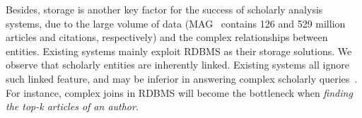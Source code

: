 %




Besides, storage is another key factor for the success of scholarly analysis systems, due to the large volume of data (\eg MAG~\cite{sinha2015overview} contains 126 and 529 million articles and citations, respectively) and the complex relationships between entities.
Existing systems mainly exploit RDBMS as their storage solutions.
%
We observe that scholarly entities are inherently linked. Existing systems all ignore such linked feature, and may be inferior in answering complex scholarly queries~\cite{BigGraphSearch}. For instance, complex joins in RDBMS will become the bottleneck when {\em finding the top-k articles of an author}.




